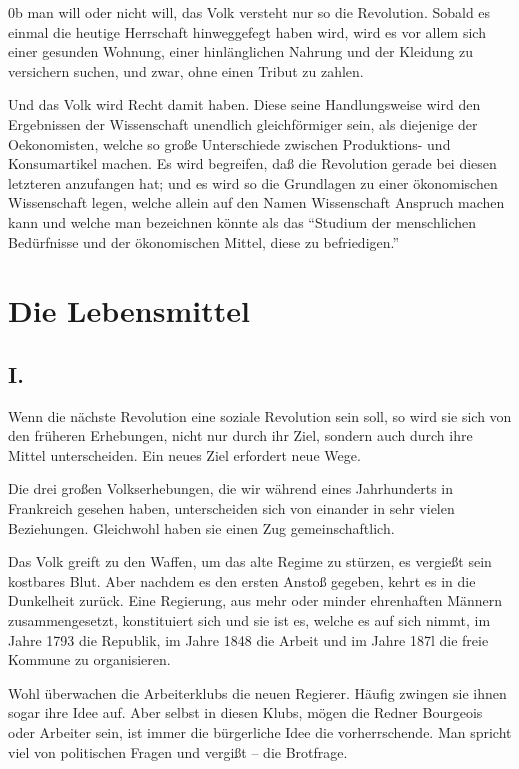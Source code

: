 \documentclass{scrbook}
\begin{document}
0b man will oder nicht will, das Volk versteht nur so die Revolution. Sobald es einmal die heutige Herrschaft hinweggefegt haben wird, wird es vor allem sich einer gesunden Wohnung, einer hinlänglichen Nahrung und der Kleidung zu versichern suchen, und zwar, ohne einen Tribut zu zahlen.

Und das Volk wird Recht damit haben. Diese seine Handlungsweise wird den Ergebnissen der Wissenschaft unendlich gleichförmiger sein, als diejenige der Oekonomisten, welche so große Unterschiede zwischen Produktions- und Konsumartikel machen. Es wird begreifen, daß die Revolution gerade bei diesen letzteren anzufangen hat; und es wird so die Grundlagen zu einer ökonomischen Wissenschaft legen, welche allein auf den Namen Wissenschaft Anspruch machen kann und welche man bezeichnen könnte als das ``Studium der menschlichen Bedürfnisse und der ökonomischen Mittel, diese zu befriedigen.''

\chapter{Die Lebensmittel}
\section*{I.}

Wenn die nächste Revolution eine soziale Revolution sein soll, so wird sie sich von den früheren Erhebungen, nicht nur durch ihr Ziel, sondern auch durch ihre Mittel unterscheiden. Ein neues Ziel erfordert neue Wege.

Die drei großen Volkserhebungen, die wir während eines Jahrhunderts in Frankreich gesehen haben, unterscheiden sich von einander in sehr vielen Beziehungen. Gleichwohl haben sie einen Zug gemeinschaftlich.

Das Volk greift zu den Waffen, um das alte Regime zu stürzen, es vergießt sein kostbares Blut. Aber nachdem es den ersten Anstoß gegeben, kehrt es in die Dunkelheit zurück. Eine Regierung, aus mehr oder minder ehrenhaften Männern zusammengesetzt, konstituiert sich und sie ist es, welche es auf sich nimmt, im Jahre 1793 die Republik, im Jahre 1848 die Arbeit und im Jahre 187l die freie Kommune zu organisieren.

Wohl überwachen die Arbeiterklubs die neuen Regierer. Häufig zwingen sie ihnen sogar ihre Idee auf. Aber selbst in diesen Klubs, mögen die Redner Bourgeois oder Arbeiter sein, ist immer die bürgerliche Idee die vorherrschende. Man spricht viel von politischen Fragen und vergißt – die Brotfrage.
\end{document}
